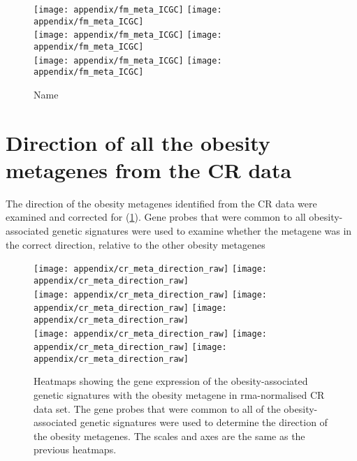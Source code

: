 \begin{appendices}
	\begin{figure}[htpb]
		\ContinuedFloat
		\captionsetup{list=off,format=cont}
		\centering
		\texttt{[image: appendix/fm\_meta\_ICGC]}
		\hfill
		\texttt{[image: appendix/fm\_meta\_ICGC]}\\
		\texttt{[image: appendix/fm\_meta\_ICGC]}
		\hfill
		\texttt{[image: appendix/fm\_meta\_ICGC]}\\
		\texttt{[image: appendix/fm\_meta\_ICGC]}
		\hfill
		\texttt{[image: appendix/fm\_meta\_ICGC]}\\
		\caption{Name}
	\end{figure}

	\section{Direction of all the obesity metagenes from the CR data}
	\label{sec:direction_of_all_the_obesity_metagenes_from_the_cr_data}

	The direction of the obesity metagenes identified from the CR data were examined and corrected for (\cref{fig:crob_meta_direction}).
	Gene probes that were common to all obesity-associated genetic signatures were used to examine whether the metagene was in the correct direction, relative to the other obesity metagenes

	\begin{figure}[htpb]
		\centering
		\texttt{[image: appendix/cr\_meta\_direction\_raw]}
		\texttt{[image: appendix/cr\_meta\_direction\_raw]}\\
		\texttt{[image: appendix/cr\_meta\_direction\_raw]}
		\texttt{[image: appendix/cr\_meta\_direction\_raw]}
		\texttt{[image: appendix/cr\_meta\_direction\_raw]}\\
		\texttt{[image: appendix/cr\_meta\_direction\_raw]}
		\texttt{[image: appendix/cr\_meta\_direction\_raw]}
		\texttt{[image: appendix/cr\_meta\_direction\_raw]}\\
		\caption[Directionality of the obesity metagenes in the CR data]{Heatmaps showing the gene expression of the obesity-associated genetic signatures with the obesity metagene in \gls{rma}-normalised CR data set.
		The gene probes that were common to all of the obesity-associated genetic signatures were used to determine the direction of the obesity metagenes.
		The scales and axes are the same as the previous heatmaps.
		}
		\label{fig:crob_meta_direction}
	\end{figure}


\end{appendices}
